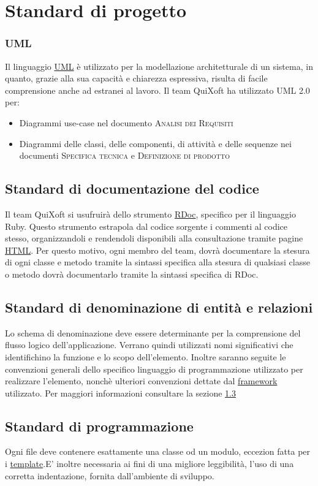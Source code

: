 \documentclass[11pt,a4paper]{article}
\begin{document}
\section{Standard di progetto}
\subsubsection{UML}
Il linguaggio \underline{UML} è utilizzato per la modellazione architetturale di un sistema, in quanto, grazie alla sua capacità e chiarezza espressiva, risulta di facile comprensione anche ad estranei al lavoro. Il team QuiXoft ha utilizzato UML 2.0 per:
\begin{itemize}
 \item Diagrammi use-case nel documento \textsc{Analisi dei Requisiti}
 \item Diagrammi delle classi, delle componenti, di attività e delle sequenze nei documenti \textsc{Specifica tecnica} e \textsc{Definizione di prodotto}
\end{itemize}

\subsection{Standard di documentazione del codice}
Il team QuiXoft si usufruirà dello strumento \underline{RDoc}, specifico per il linguaggio Ruby. Questo strumento estrapola dal codice sorgente i commenti al codice stesso, organizzandoli e rendendoli disponibili alla consultazione tramite pagine \underline{HTML}. Per questo motivo, ogni membro del team, dovrà documentare la stesura di ogni classe e metodo tramite la sintassi specifica alla stesura di qualsiasi classe o metodo dovrà documentarlo tramite la sintassi specifica di RDoc.

\subsection{Standard di denominazione di entità e relazioni}
Lo schema di denominazione deve essere determinante per la comprensione del flusso logico dell'applicazione. Verrano quindi utilizzati nomi significativi che identifichino la funzione e lo scopo dell'elemento. Inoltre saranno seguite le convenzioni generali dello specifico linguaggio di programmazione utilizzato per realizzare l'elemento, nonchè ulteriori convenzioni dettate dal \underline{framework} utilizzato. Per maggiori informazioni consultare la sezione \ref{programmazione}

\subsection{Standard di programmazione}\label{programmazione}
Ogni file deve contenere esattamente una classe od un modulo, eccezion fatta per i \underline{template}.E' inoltre necessaria ai fini di una migliore leggibilità, l'uso di una corretta indentazione, fornita dall'ambiente di sviluppo.
\end{document}
